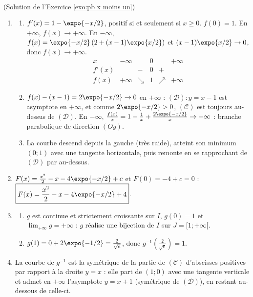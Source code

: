 \begin{corrige}
\begin{sol} ~ \\
(Solution de l'Exercice \ref{exo:pb x moins un})
\begin{enumerate}
\item \begin{enumerate}
      \item $f'(x) = 1 - \expo{-x/2}$, positif si et seulement si $x \geq 0$. $f(0) = 1$.
            En $+\infty$, $f(x) \to +\infty$. En $-\infty$, $f(x) = \expo{-x/2}\left( 2 + (x - 1)\expo{x/2} \right)$ et
            $(x-1)\expo{x/2} \to 0$, donc $f(x) \to +\infty$.
            \[
            \begin{array}{c|ccccc}
            x & -\infty & & 0 & & +\infty \\ \hline
            f'(x) & & - & 0 & + & \\ \hline
            f(x) & +\infty & \searrow & 1 & \nearrow & +\infty
            \end{array}
            \]
      \item $f(x) - (x - 1) = 2\expo{-x/2} \to 0$ en $+\infty$ : $\boxed{(\mathcal{D}) : y = x - 1}$ est asymptote en $+\infty$,
            et comme $2\expo{-x/2} > 0$, $(\mathscr{C})$ est toujours au-dessus de $(\mathcal{D})$.
            En $-\infty$, $\frac{f(x)}{x} = 1 - \frac{1}{x} + \frac{2\expo{-x/2}}{x} \to -\infty$ : branche parabolique de direction $(Oy)$.
      \item La courbe descend depuis la gauche (tr\`es raide), atteint son minimum $(0 ; 1)$ avec une tangente horizontale,
            puis remonte en se rapprochant de $(\mathcal{D})$ par au-dessus.
      \end{enumerate}
\item $F(x) = \frac{x^2}{2} - x - 4\expo{-x/2} + c$ et $F(0) = -4 + c = 0$ :
      $\boxed{F(x) = \frac{x^2}{2} - x - 4\expo{-x/2} + 4}$.
\item \begin{enumerate}
      \item $g$ est continue et strictement croissante sur $I$, $g(0) = 1$ et $\lim_{+\infty} g = +\infty$ :
            $g$ r\'ealise une bijection de $I$ sur $\boxed{J = [1 ; +\infty[}$.
      \item $g(1) = 0 + 2\expo{-1/2} = \frac{2}{\sqrt{e}}$, donc $\boxed{g^{-1}\left(\frac{2}{\sqrt{e}}\right) = 1}$.
      \end{enumerate}
\item La courbe de $g^{-1}$ est la sym\'etrique de la partie de $(\mathscr{C})$ d'abscisses positives par rapport \`a la droite
      $y = x$ : elle part de $(1 ; 0)$ avec une tangente verticale et admet en $+\infty$ l'asymptote $y = x + 1$
      (sym\'etrique de $(\mathcal{D})$), en restant au-dessous de celle-ci.
\end{enumerate}
\end{sol}


\end{corrige}
